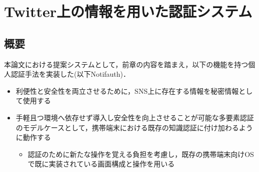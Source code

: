 \chapter{Twitter上の情報を用いた認証システム}\label{chap:system}
\section{概要}\label{sec:systemIntro}
本論文における提案システムとして，前章の内容を踏まえ，以下の機能を持つ個人認証手法を実装した(以下Notifauth)．
\begin{itemize}
  \item 利便性と安全性を両立させるために，SNS上に存在する情報を秘密情報として使用する
  \item 手軽且つ環境へ依存せず導入し安全性を向上させることが可能な多要素認証のモデルケースとして，携帯端末における既存の知識認証に付け加わるように動作する
  \begin{itemize}
    \item 認証のために新たな操作を覚える負担を考慮し，既存の携帯端末向けOSで既に実装されている画面構成と操作を用いる
  \end{itemize}
\end{itemize}

